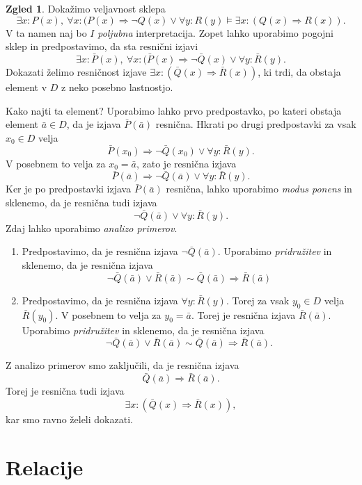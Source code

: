 \documentclass[11pt]{book}
\theoremstyle{definition}
\theoremstyle{zgled}
\newtheorem*{zgled}{Zgled}
\theoremstyle{odprtproblem}
\theoremstyle{domacanaloga}
\theoremstyle{izrek}
\begin{document}
\begin{zgled}
Dokažimo veljavnost sklepa
\[
    \exists x \colon P(x), \
    \forall x \colon (P(x) \Rightarrow \lnot Q(x) \lor \forall y \colon R(y) \models
    \exists x \colon (Q(x) \Rightarrow R(x)).
\]
V ta namen naj bo $I$ \emph{poljubna} interpretacija. Zopet lahko uporabimo pogojni sklep in predpostavimo, da sta resnični izjavi
\[
    \exists x \colon \bar P(x), \
    \forall x \colon (\bar P(x) \Rightarrow \lnot \bar Q(x) \lor \forall y \colon \bar R(y).
\]
Dokazati želimo resničnost izjave $\exists x \colon (\bar Q(x) \Rightarrow \bar R(x))$, ki trdi, da obstaja element v $D$ z neko posebno lastnostjo. 

Kako najti ta element? Uporabimo lahko prvo predpostavko, po kateri obstaja element $\bar a \in D$, da je izjava $\bar P(\bar a)$ resnična. Hkrati po drugi predpostavki za vsak $x_0 \in D$ velja
\[
    \bar P(x_0) \Rightarrow \lnot \bar Q(x_0) \lor \forall y \colon \bar R(y).  
\]
V posebnem to velja za $x_0 = \bar a$, zato je resnična izjava
\[
    \bar P(\bar a) \Rightarrow \lnot \bar Q(\bar a) \lor \forall y \colon \bar R(y).  
\]
Ker je po predpostavki izjava $\bar P(\bar a)$ resnična, lahko uporabimo \emph{modus ponens} in sklenemo, da je resnična tudi izjava
\[
    \lnot \bar Q(\bar a) \lor \forall y \colon \bar R(y).   
\]
Zdaj lahko uporabimo \emph{analizo primerov}.
\begin{enumerate}
    \item Predpostavimo, da je resnična izjava $\lnot \bar Q(\bar a)$. Uporabimo \emph{pridružitev} in sklenemo, da je resnična izjava
    \[
        \lnot \bar Q(\bar a) \lor \bar R(\bar a) \sim \bar Q(\bar a) \Rightarrow \bar R(\bar a)
    \]
    \item Predpostavimo, da je resnična izjava $\forall y \colon \bar R(y)$. Torej za vsak $y_0 \in D$ velja $\bar R(y_0)$. V posebnem to velja za $y_0 = \bar a$. Torej je resnična izjava $\bar R(\bar a)$. Uporabimo \emph{pridružitev} in sklenemo, da je resnična izjava 
    \[
        \lnot \bar Q(\bar a) \lor \bar R(\bar a) \sim \bar Q(\bar a) \Rightarrow \bar R(\bar a).
    \]
\end{enumerate}
Z analizo primerov smo zaključili, da je resnična izjava
\[
    \bar Q(\bar a) \Rightarrow \bar R(\bar a).
\]
Torej je resnična tudi izjava
\[
    \exists x \colon ( \bar Q(x) \Rightarrow \bar R(x) ),
\]
kar smo ravno želeli dokazati.
\end{zgled}

\chapter{Relacije}
\end{document}
